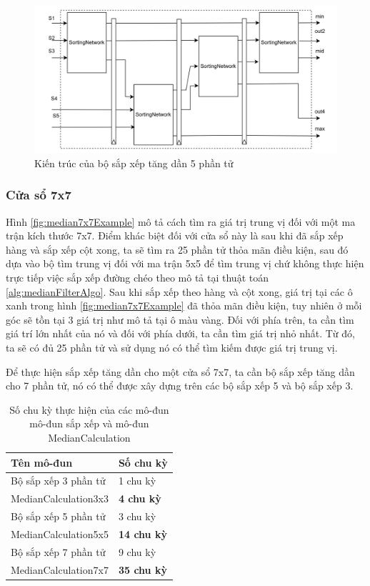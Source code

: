\begin{figure}[!ht]
	\centering
	\includegraphics[width=\linewidth]{figures/sortAscending5x5RTL.png}
	\caption{Kiến trúc của bộ sắp xếp tăng dần 5 phần tử}
	\label{fig:sortAscending5x5RTL}
\end{figure}

\subsubsection{Cửa sổ 7x7}

Hình \ref{fig:median7x7Example} mô tả cách tìm ra giá trị trung vị đối với một ma trận kích thước 7x7. Điểm khác biệt đối với cửa sổ này là sau khi đã sắp xếp hàng và sắp xếp cột xong, ta sẽ tìm ra 25 phần tử thỏa mãn điều kiện, sau đó dựa vào bộ tìm trung vị đối với ma trận 5x5 để tìm trung vị chứ không thực hiện trực tiếp việc sắp xếp đường chéo theo mô tả tại thuật toán \ref{alg:medianFilterAlgo}. Sau khi sắp xếp theo hàng và cột xong, giá trị tại các ô xanh trong hình \ref{fig:median7x7Example} đã thỏa mãn điều kiện, tuy nhiên ở mỗi góc sẽ tồn tại 3 giá trị như mô tả tại ô màu vàng. Đối với phía trên, ta cần tìm giá trí lớn nhất của nó và đối với phía dưới, ta cần tìm giá trị nhỏ nhất. Từ đó, ta sẽ có đủ 25 phần tử và sử dụng nó có thể tìm kiếm được giá trị trung vị.

Để thực hiện sắp xếp tăng dần cho một cửa sổ 7x7, ta cần bộ sắp xếp tăng dần cho 7 phần tử, nó có thể được xây dựng trên các bộ sắp xếp 5 và bộ sắp xếp 3.


\begin{table}[H]
	\centering
	\renewcommand{\arraystretch}{1.3}
		\caption{Số chu kỳ thực hiện của các mô-đun mô-đun sắp xếp và mô-đun MedianCalculation}
	\begin{tabular}{|p{5cm} p{5cm} |}
		\hline
		\rowcolor{gray!30}
		\textbf{Tên mô-đun} & \textbf{Số chu kỳ}
		\\ \hline
		Bộ sắp xếp 3 phần tử & 1 chu kỳ
		  \\
		\hline
		MedianCalculation3x3  & \textbf{4 chu kỳ}
		\\ \hline
		Bộ sắp xếp 5 phần tử & 3 chu kỳ
		\\ \hline
		MedianCalculation5x5 & \textbf{14 chu kỳ}
			\\ \hline
		Bộ sắp xếp 7 phần tử & 9 chu kỳ
		\\ \hline
		MedianCalculation7x7 & \textbf{35 chu kỳ}
		\\ \hline
	\end{tabular}

	\label{tab:numberOfCycleMedianCalculation}
\end{table}


